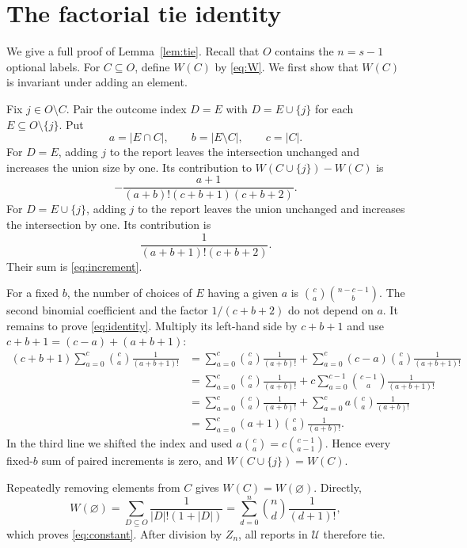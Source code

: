 \section{The factorial tie identity}
\label{app:tie}

We give a full proof of Lemma~\ref{lem:tie}. Recall that $O$ contains the
$n=s-1$ optional labels. For $C\subseteq O$, define $W(C)$ by
\eqref{eq:W}. We first show that $W(C)$ is invariant under adding an element.

Fix $j\in O\setminus C$. Pair the outcome index $D=E$ with
$D=E\cup\{j\}$ for each $E\subseteq O\setminus\{j\}$. Put
\[
 a=|E\cap C|,\qquad b=|E\setminus C|,\qquad c=|C|.
\]
For $D=E$, adding $j$ to the report leaves the intersection unchanged and
increases the union size by one. Its contribution to
$W(C\cup\{j\})-W(C)$ is
\[
 -\frac{a+1}{(a+b)!(c+b+1)(c+b+2)}.
 \tag{35}\label{eq:nojinD}
\]
For $D=E\cup\{j\}$, adding $j$ to the report leaves the union unchanged and
increases the intersection by one. Its contribution is
\[
 \frac1{(a+b+1)!(c+b+2)}.
 \tag{36}\label{eq:jinD}
\]
Their sum is \eqref{eq:increment}.

For a fixed $b$, the number of choices of $E$ having a given $a$ is
$\binom ca\binom{n-c-1}{b}$. The second binomial coefficient and the factor
$1/(c+b+2)$ do not depend on $a$. It remains to prove
\eqref{eq:identity}. Multiply its left-hand side by $c+b+1$ and use
$c+b+1=(c-a)+(a+b+1)$:
\begin{align}
 (c+b+1)\sum_{a=0}^c\binom ca\frac1{(a+b+1)!}
 &=\sum_{a=0}^c\binom ca\frac1{(a+b)!}
   +\sum_{a=0}^c(c-a)\binom ca\frac1{(a+b+1)!}\\
 &=\sum_{a=0}^c\binom ca\frac1{(a+b)!}
   +c\sum_{a=0}^{c-1}\binom{c-1}{a}\frac1{(a+b+1)!}\\
 &=\sum_{a=0}^c\binom ca\frac1{(a+b)!}
   +\sum_{a=0}^ca\binom ca\frac1{(a+b)!}\\
 &=\sum_{a=0}^c(a+1)\binom ca\frac1{(a+b)!}.
 \tag{37}\label{eq:identityproof}
\end{align}
In the third line we shifted the index and used
$a\binom ca=c\binom{c-1}{a-1}$. Hence every fixed-$b$ sum of paired
increments is zero, and $W(C\cup\{j\})=W(C)$.

Repeatedly removing elements from $C$ gives $W(C)=W(\varnothing)$. Directly,
\[
 W(\varnothing)
 =\sum_{D\subseteq O}\frac1{|D|!(1+|D|)}
 =\sum_{d=0}^n\binom nd\frac1{(d+1)!},
 \tag{38}\label{eq:wempty}
\]
which proves \eqref{eq:constant}. After division by $Z_n$, all reports in
$\mathcal U$ therefore tie.

